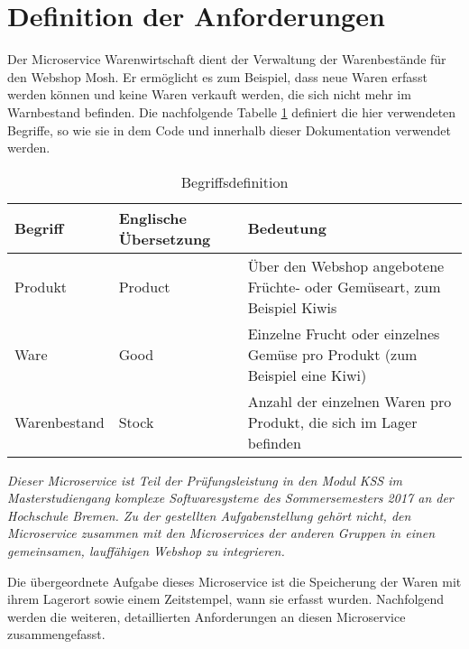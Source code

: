 \section{Definition der Anforderungen}
\label{sec: Definition der Anforderungen}

Der Microservice Warenwirtschaft dient der Verwaltung der Warenbestände für den Webshop Mosh. Er ermöglicht es zum Beispiel, dass neue Waren erfasst werden können und keine Waren verkauft werden, die sich nicht mehr im Warnbestand befinden.  Die nachfolgende Tabelle \ref{tabl:Begriffe} definiert die hier verwendeten Begriffe, so wie sie in dem Code und innerhalb dieser Dokumentation verwendet werden.
\begin{table}[H]
\begin{small}
	\begin{center}
  	\caption{Begriffsdefinition}
   	\renewcommand{\arraystretch}{1.0}
    \begin{tabularx}{\textwidth}{|X|X|X|}		
    
    \hline
    			
    \textbf{Begriff} & \textbf{Englische Übersetzung} &\textbf{Bedeutung}\\ \hline
    
    Produkt & Product & Über den Webshop angebotene Früchte- oder Gemüseart, zum Beispiel Kiwis\\ \hline
	Ware & Good & Einzelne Frucht oder einzelnes Gemüse pro Produkt (zum Beispiel eine Kiwi)\\ \hline
	Warenbestand & Stock & Anzahl der einzelnen Waren pro Produkt, die sich im Lager befinden\\ \hline
    
	\end{tabularx}
	\label{tabl:Begriffe}
	\end{center}
\end{small}
\end{table}

\textit{\textit{Dieser Microservice ist Teil der Prüfungsleistung in den Modul KSS im Masterstudiengang komplexe Softwaresysteme des Sommersemesters 2017 an der Hochschule Bremen. Zu der gestellten Aufgabenstellung gehört nicht, den Microservice zusammen mit den Microservices der anderen Gruppen in einen gemeinsamen, lauffähigen Webshop zu integrieren.}}

\newpage
Die übergeordnete Aufgabe dieses Microservice ist die Speicherung der Waren mit ihrem Lagerort sowie einem Zeitstempel, wann sie erfasst wurden. Nachfolgend werden die weiteren, detaillierten Anforderungen an diesen Microservice zusammengefasst. 

